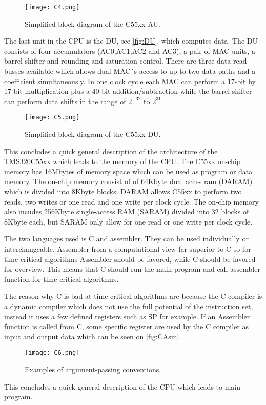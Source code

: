 \begin{figure}[H]
\centering
\texttt{[image: C4.png]}
\caption{Simplified block diagram of the C55xx AU.}
\label{fig:AU}
\end{figure}
The last unit in the CPU is the DU, see \autoref{fig:DU}, which computes data. The DU consists of four accumulators (AC0,AC1,AC2 and AC3), a pair of MAC units, a barrel shifter and rounding and saturation control. There are three data read busses available which allows dual MAC´s access to up to two data paths and a coefficient simultaneously. In one clock cycle each MAC can perform a 17-bit by 17-bit multiplication plus a 40-bit addition/subtraction while the barrel shifter can perform data shifts in the range of $2^{-32}$ to $2^{31}$. 
\begin{figure}[H]
\centering
\texttt{[image: C5.png]}
\caption{Simplified block diagram of the C55xx DU.}
\label{fig:DU}
\end{figure}
This concludes a quick general description of the architecture of the TMS320C55xx which leads to the memory of the CPU. The C55xx on-chip memory has 16Mbytes of memory space which can be used as program or data memory. The on-chip memory consist of of 64Kbyte dual acces ram (DARAM) which is divided into 8Kbyte blocks. DARAM allows C55xx to perform two reads, two writes or one read and one write per clock cycle. The on-chip memory also incudes 256Kbyte single-access RAM (SARAM) divided into 32 blocks of 8Kbyte each, but SARAM only allow for one read or one write per clock cycle.

The two languages used is C and assembler. They can be used individually or interchangeable. Assembler from a computational view far superior to C so for time critical algorithms Assembler should be favored, while C should be favored for overview. This means that C should run the main program and call assembler function for time critical algorithms. 

The reason why C is bad at time critical algorithms are because the C compiler is a dynamic compiler which does not use the full potential of the instruction set, instead it uses a few defined registers such as SP for example. If an Assembler function is called from C, some specific register are used by the C compiler as input and output data which can be seen on \autoref{fig:CAsm}.
\begin{figure}[H]
\centering
\texttt{[image: C6.png]}
\caption{Examples of argument-passing conventions.}
\label{fig:CAsm}
\end{figure}
This concludes a quick general description of the CPU which leads to main program.
